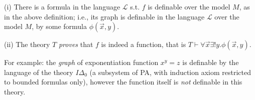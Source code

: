 \documentclass[12pt]{article}
\begin{document}
(i) There is a formula in the language $\mathcal{L}$ s.t. $f$ is definable over the model $M$, as in the above definition; i.e., its graph is definable in the language $\mathcal{L}$ over the model $M$, by some formula $\phi(\vec{x}, y)$.

(ii) The theory $T$ \emph{proves} that $f$ is indeed a function, that is $T\vdash \forall \vec{x} \exists ! y. \phi(\vec{x}, y)$.

For example: the \emph{graph} of exponentiation function $x^y=z$ is definable by the language of the theory $I\Delta_0$ (a subsystem of PA, with induction axiom restricted to bounded formulas only), however the function itself is \emph{not} definable in this theory.




%
\end{document}
